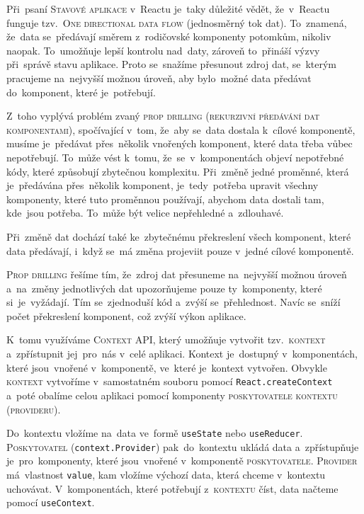 \documentclass[14pt,a4paper]{article}
\begin{document}
        Při~psaní \textsc{Stavové aplikace} v~Reactu je~taky důležité vědět, že~v~Reactu funguje tzv.~\textsc{One directional data flow} (jednosměrný tok dat). To~znamená, že~data se~předávají směrem z~rodičovské komponenty potomkům, nikoliv naopak. To~umožňuje lepší kontrolu nad~daty, zároveň to~přináší výzvy při~správě stavu aplikace. Proto se~snažíme přesunout zdroj dat, se~kterým pracujeme na~nejvyšší možnou úroveň, aby bylo~možné data předávat do~komponent, které je~potřebují.
        
        Z~toho vyplývá problém zvaný \textsc{prop drilling} (\textsc{rekurzivní předávání dat komponentami}), spočívající v~tom, že~aby se~data dostala k~cílové komponentě, musíme je~předávat přes~několik vnořených komponent, které data třeba vůbec nepotřebují. To~může vést k~tomu, že~se~v~komponentách objeví nepotřebné kódy, které způsobují zbytečnou komplexitu. Při~změně jedné proměnné, která je~předávána přes~několik komponent, je~tedy~potřeba upravit všechny komponenty, které tuto proměnnou používají, abychom data dostali tam, kde~jsou potřeba. To~může být velice nepřehledné a~zdlouhavé.
        
        Při~změně dat dochází také ke~zbytečnému překreslení všech komponent, které data předávají, i~když se~má změna projeviit pouze v~jedné cílové komponentě.

        \textsc{Prop drilling} řešíme tím, že~zdroj dat přesuneme na~nejvyšší možnou úroveň a~na~změny jednotlivých dat upozorňujeme pouze ty~komponenty, které si~je~vyžádají. Tím se~zjednoduší kód a~zvýší se~přehlednost. Navíc se~sníží počet překreslení komponent, což zvýší výkon aplikace.
        
        K~tomu využíváme \textsc{Context API}, který umožňuje vytvořit tzv.~\textsc{kontext} a~zpřístupnit jej~pro~nás v~celé aplikaci. Kontext je~dostupný v~komponentách, které jsou~vnořené v~komponentě, ve~které je~kontext vytvořen. Obvykle \textsc{kontext} vytvoříme v~samostatném souboru pomocí \texttt{React.createContext} a~poté obalíme celou aplikaci pomocí komponenty \textsc{poskytovatele kontextu} (\textsc{provideru}).
        
        Do~kontextu vložíme  na~data ve~formě \texttt{useState} nebo \texttt{useReducer}. \textsc{Poskytovatel} (\texttt{context.Provider}) pak~do~kontextu ukládá data a~zpřístupňuje je~pro~komponenty, které jsou~vnořené v~komponentě \textsc{poskytovatele}. \parencite{hswolff:reactContextReducer}
        \textsc{Provider} má~vlastnost \texttt{value}, kam vložíme výchozí data, která chceme v~kontextu uchovávat. V~komponentách, které potřebují z~\textsc{kontextu} číst, data načteme pomocí \texttt{useContext}.
        
\end{document}
